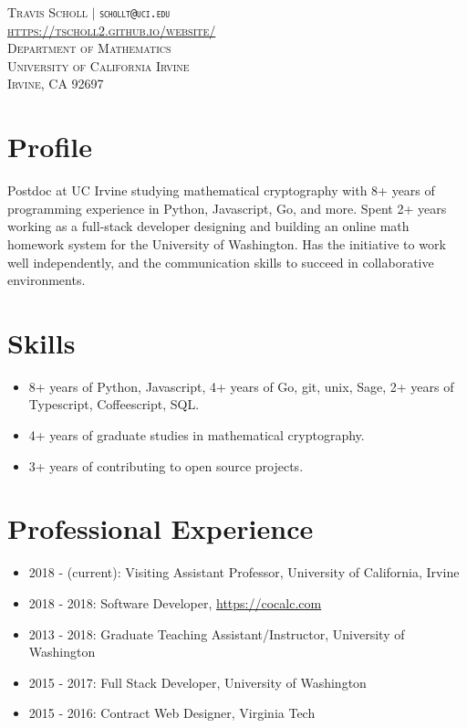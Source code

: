 \documentclass{article}
\begin{document}
	\vspace*{-1.5in}

	\begin{center}
	\textsc{
		Travis Scholl $\vert$ {\tt schollt@uci.edu} \\ \url{https://tscholl2.github.io/website/} \\
		Department of Mathematics \\
		University of California Irvine \\
		Irvine, CA 92697
	}
	\end{center}

	\section{Profile}

	Postdoc at UC Irvine studying mathematical cryptography with 8+ years of programming experience in Python, Javascript, Go, and more. Spent 2+ years working as a full-stack developer designing and building an online math homework system for the University of Washington. Has the initiative to work well independently, and the communication skills to succeed in collaborative environments.

	\section{Skills}

	\begin{itemize}
		\item 8+ years of Python, Javascript, 4+ years of Go, git, unix, Sage, 2+ years of Typescript, Coffeescript, SQL.
		\item 4+ years of graduate studies in mathematical cryptography.
		\item 3+ years of contributing to open source projects.
	\end{itemize}

	\section{Professional Experience}

	\begin{itemize}
		\item 2018 - (current): Visiting Assistant Professor, University of California, Irvine
		\item 2018 - 2018: Software Developer, \url{https://cocalc.com}
		\item 2013 - 2018: Graduate Teaching Assistant/Instructor, University of Washington
		\item 2015 - 2017: Full Stack Developer, University of Washington
		\item 2015 - 2016: Contract Web Designer, Virginia Tech
	\end{itemize}
\end{document}
